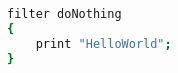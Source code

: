 \begin{lstlisting}[language=bash, caption={Filter printing message}]
filter doNothing
{
    print "HelloWorld";
}
\end{lstlisting}